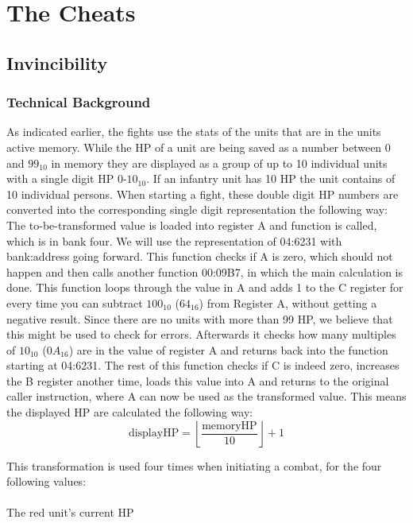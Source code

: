 \section{The Cheats}
\subsection{Invincibility}
\subsubsection{Technical Background}
As indicated earlier, the fights use the stats of the units that are in the units active memory.
While the HP of a unit are being saved as a number between 0 and $99_{10}$ in memory they are displayed as a group of up to 10 individual units with a single digit HP 0-$10_{10}$. If an infantry unit has 10 HP the unit contains of 10 individual persons. When starting a fight, these double digit HP numbers are converted into the corresponding single digit representation the following way:
The to-be-transformed value is loaded into register A and function  is called, which is in bank four. We will use the representation of 04:6231 with bank:address going forward. This function checks if A is zero, which should not happen and then calls another function 00:09B7, in which the main calculation is done.
This function loops through the value in A and adds 1 to the C register for every time you can subtract $100_{10}$ ($64_{16}$) from Register A, without getting a negative result. Since there are no units with more than 99 HP, we believe that this might be used to check for errors. Afterwards it checks how many multiples of $10_{10}$ ($0A_{16}$) are in the value of register A and returns back into the function starting at 04:6231.
The rest of this function checks if C is indeed zero, increases the B register another time, loads this value into A and returns to the original caller instruction, where A can now be used as the transformed value.
This means the displayed HP are calculated the following way:
\begin{equation}
	\text{displayHP} = \left\lfloor \frac{\text{memoryHP}}{10} \right\rfloor + 1
\end{equation}

This transformation is used four times when initiating a combat, for the four following values:
\paragraph{}
The red unit's current HP

